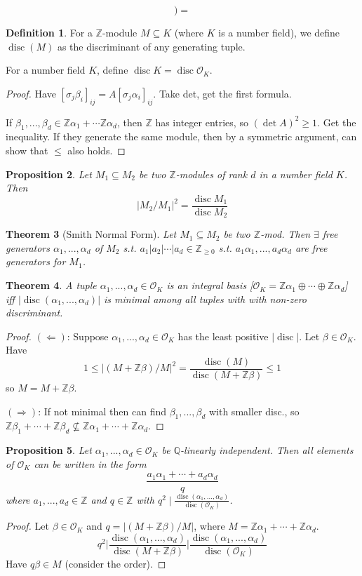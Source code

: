 \documentclass{article}
\theoremstyle{definition}
\newtheorem{defn}{Definition}[section]
\theoremstyle{remark}
\theoremstyle{plain}
\newtheorem{thm}[defn]{Theorem}
\newtheorem{prop}[defn]{Proposition}
\newcommand{\ZZ}{\mathbb{Z}}
\newcommand{\QQ}{\mathbb{Q}}
\newcommand{\disc}{\operatorname{disc}}
\begin{document}
\[)=\tag{Owen's Signature}\]
\begin{defn}
    For a $\ZZ$-module $M\subseteq K$ (where $K$ is a number field), we define $\disc(M)$ as the discriminant of any generating tuple.

    For a number field $K$, define $\disc K=\disc\mathcal O_K$.
\end{defn}
\begin{proof}
    Have $[\sigma_j{\beta_i}]_{ij}=A[\sigma_j\alpha_i]_{ij}$. Take det, get the first formula.

    If $\beta_1,...,\beta_d\in\ZZ\alpha_1+\cdots\ZZ\alpha_d$, then $\ZZ$ has integer entries, so $(\det A)^2\geqslant 1$. Get the inequality. If they generate the same module, then by a symmetric argument, can show that $\le$ also holds.
\end{proof}
\begin{prop}
    Let $M_1\subseteq M_2$ be two $\ZZ$-modules of rank $d$ in a number field $K$. Then 
    \[|M_2/M_1|^2=\dfrac{\disc M_1}{\disc M_2}\]
\end{prop}
\begin{thm}[Smith Normal Form]
    Let $M_1\subseteq M_2$ be two $\ZZ$-mod. Then $\exists$ free generators $\alpha_1,...,\alpha_d$ of $M_2$ s.t. $a_1|a_2|\cdots|a_d\in\ZZ_{\ge 0}$ s.t. $a_1\alpha_1,...,a_d\alpha_d$ are free generators for $M_1$.
\end{thm}
\begin{thm}
    A tuple $\alpha_1,...,\alpha_d\in\mathcal O_K$ is an integral basis [$\mathcal O_K=\ZZ\alpha_1\oplus\cdots\oplus\ZZ\alpha_d$] iff $|\disc(\alpha_1,...,\alpha_d)|$ is minimal among all tuples with with non-zero discriminant.
\end{thm}
\begin{proof}
    $(\Leftarrow)$: Suppose $\alpha_1,...,\alpha_d\in\mathcal O_K$ has the least positive $|\disc|$. Let $\beta\in\mathcal O_K$. Have
    \[1\le |(M+\ZZ\beta)/M|^2=\dfrac{\disc(M)}{\disc(M+\ZZ\beta)}\le1\]
    so $M=M+\ZZ\beta$.

    $(\Rightarrow)$: If not minimal then can find $\beta_1,...,\beta_d$ with smaller disc., so $\ZZ\beta_1+\cdots+\ZZ\beta_d\nsubseteq\ZZ\alpha_1+\cdots+\ZZ\alpha_d$.
\end{proof}
\begin{prop}
    Let $\alpha_1,...,\alpha_d\in\mathcal O_K$ be $\QQ$-linearly independent. Then all elements of $\mathcal O_K$ can be written in the form
    \[\dfrac{a_1\alpha_1+\cdots+a_d\alpha_d}{q}\]
    where $a_1,...,a_d\in\ZZ$ and $q\in\ZZ$ with $q^2\mid \frac{\disc(\alpha_1,...,\alpha_d)}{\disc(\mathcal O_K)}$.
\end{prop}
\begin{proof}
    Let $\beta\in\mathcal O_K$ and $q=|(M+\ZZ\beta)/M|$, where $M=\ZZ\alpha_1+\cdots+\ZZ\alpha_d$.
    \[q^2\Bigg|\frac{\disc(\alpha_1,...,\alpha_d)}{\disc(M+\ZZ\beta)}\Bigg|\frac{\disc(\alpha_1,...,\alpha_d)}{\disc(\mathcal O_K)}\]
    Have $q\beta\in M$ (consider the order).
\end{proof}
\end{document}
